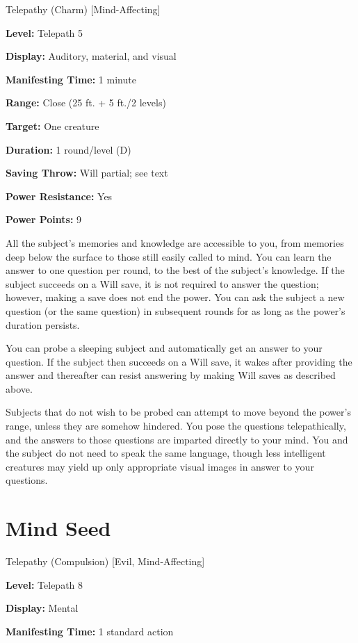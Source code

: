 \documentclass{article}
\begin{document}
Telepathy (Charm) [Mind-Affecting]

\textbf{Level:} Telepath 5

\textbf{Display:} Auditory, material, and visual

\textbf{Manifesting Time:} 1 minute

\textbf{Range:} Close (25 ft. + 5 ft./2 levels)

\textbf{Target:} One creature

\textbf{Duration:} 1 round/level (D)

\textbf{Saving Throw:} Will partial; see text

\textbf{Power Resistance:} Yes

\textbf{Power Points:} 9

All the subject's memories and knowledge are accessible to you, from memories deep 
below the surface to those still easily called to mind. You can learn the answer 
to one question per round, to the best of the subject's knowledge. If the subject 
succeeds on a Will save, it is not required to answer the question; however, making 
a save does not end the power. You can ask the subject a new question (or the same 
question) in subsequent rounds for as long as the power's duration persists.

You can probe a sleeping subject and automatically get an answer to your question. 
If the subject then succeeds on a Will save, it wakes after providing the answer 
and thereafter can resist answering by making Will saves as described above.

Subjects that do not wish to be probed can attempt to move beyond the power's range, 
unless they are somehow hindered. You pose the questions telepathically, and the 
answers to those questions are imparted directly to your mind. You and the subject 
do not need to speak the same language, though less intelligent creatures may yield 
up only appropriate visual images in answer to your questions.

\vspace{12pt}
\section*{Mind Seed}

Telepathy (Compulsion) [Evil, Mind-Affecting]

\textbf{Level:} Telepath 8

\textbf{Display:} Mental

\textbf{Manifesting Time:} 1 standard action
\end{document}
